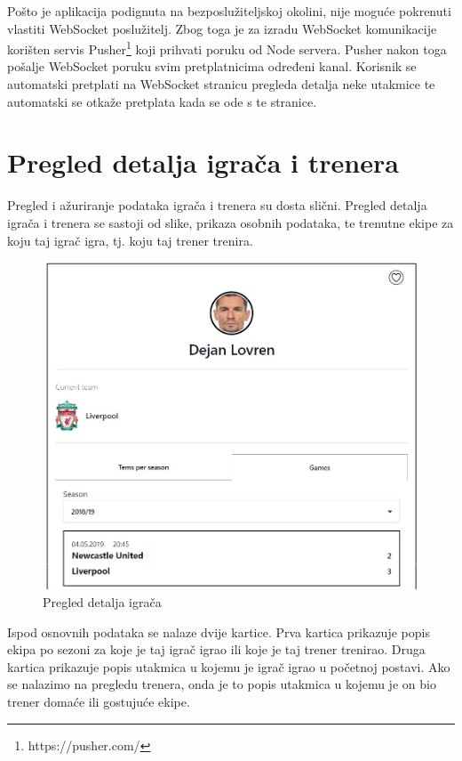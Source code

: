 \documentclass[times, utf8, zavrsni]{fer}
\begin{document}
Pošto je aplikacija podignuta na bezposlužiteljskoj okolini, nije moguće pokrenuti vlastiti WebSocket poslužitelj.
Zbog toga je za izradu WebSocket komunikacije korišten servis Pusher\footnote{https://pusher.com/} koji prihvati poruku od Node servera.
Pusher nakon toga pošalje WebSocket poruku svim pretplatnicima određeni kanal. Korisnik se automatski pretplati na WebSocket stranicu pregleda detalja neke utakmice te automatski se otkaže pretplata kada se ode s te stranice.

\section{Pregled detalja igrača i trenera}

Pregled i ažuriranje podataka igrača i trenera su dosta slični. Pregled detalja igrača i trenera se sastoji od slike, prikaza osobnih podataka, te trenutne ekipe za koju taj igrač igra, tj. koju taj trener trenira.

\begin{figure}[htb]
\centering
\includegraphics[width=12cm]{images/lovren.jpg}
\caption{Pregled detalja igrača}
\label{fig:player}
\end{figure}

Ispod osnovnih podataka se nalaze dvije kartice. Prva kartica prikazuje popis ekipa po sezoni za koje je taj igrač igrao ili koje je taj trener trenirao.
Druga kartica prikazuje popis utakmica u kojemu je igrač igrao u početnoj postavi. Ako se nalazimo na pregledu trenera, onda je to popis utakmica u kojemu je on bio trener domaće ili gostujuće ekipe.
\end{document}
